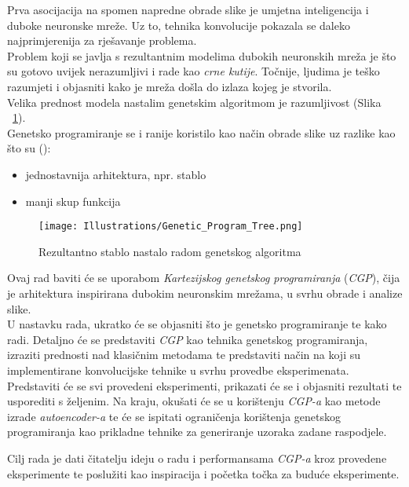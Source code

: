 Prva asocijacija na spomen napredne obrade slike je umjetna inteligencija i duboke neuronske mreže.
Uz to, tehnika konvolucije pokazala se daleko najprimjerenija za rješavanje problema. \\
Problem koji se javlja s rezultantnim modelima dubokih neuronskih mreža je što su gotovo uvijek nerazumljivi i rade kao \emph{crne kutije}.
Točnije, ljudima je teško razumjeti i objasniti kako je mreža došla do izlaza kojeg je stvorila. \\
Velika prednost modela nastalim genetskim algoritmom je razumljivost (Slika ~\ref{fig:gen_alg_tree_1}). \\
Genetsko programiranje se i ranije koristilo kao način obrade slike uz razlike kao što su (\cite{cgp_image_processing}):
\begin{itemize}
	\item jednostavnija arhitektura, npr. stablo
	\item manji skup funkcija
\end{itemize}

\begin{figure}
	\centering
	\texttt{[image: Illustrations/Genetic\_Program\_Tree.png]}
	\caption{Rezultantno stablo nastalo radom genetskog algoritma}
	\label{fig:gen_alg_tree_1}
\end{figure}

Ovaj rad baviti će se uporabom \emph{Kartezijskog genetskog programiranja} (\emph{CGP}), čija je arhitektura inspirirana dubokim neuronskim mrežama, u svrhu obrade i analize slike. \\
U nastavku rada, ukratko će se objasniti što je genetsko programiranje te kako radi.
Detaljno će se predstaviti \emph{CGP} kao tehnika genetskog programiranja, izraziti prednosti nad klasičnim metodama te predstaviti način na koji su implementirane konvolucijske tehnike u svrhu provedbe eksperimenata.
Predstaviti će se svi provedeni eksperimenti, prikazati će se i objasniti rezultati te usporediti s željenim.
Na kraju, okušati će se u korištenju \emph{CGP-a} kao metode izrade \emph{autoencoder-a} te će se ispitati ograničenja korištenja genetskog programiranja kao prikladne tehnike za generiranje uzoraka zadane raspodjele.

Cilj rada je dati čitatelju ideju o radu i performansama \emph{CGP-a} kroz provedene eksperimente te poslužiti kao inspiracija i početka točka za buduće eksperimente.

